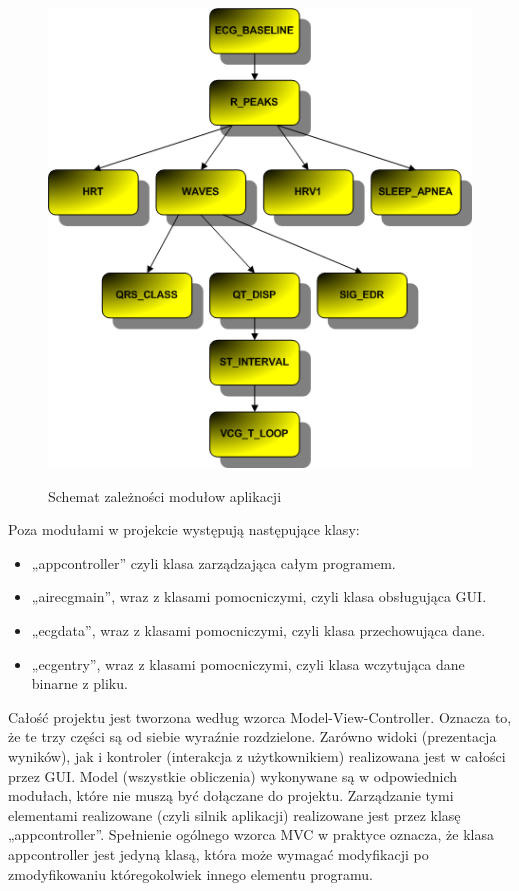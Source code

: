 \begin{figure}[H]
\centering
\includegraphics[scale=0.7]{MVC/img/EKG}
\label{fig:zaleznosci}
\caption{Schemat zależności modułow aplikacji}
\end{figure}

Poza modułami w projekcie występują następujące klasy:
\begin{itemize}
\item „appcontroller” czyli klasa zarządzająca całym programem.
\item „airecgmain”, wraz z klasami pomocniczymi, czyli klasa obsługująca GUI.
\item „ecgdata”, wraz z klasami pomocniczymi, czyli klasa przechowująca dane.
\item „ecgentry”, wraz z klasami pomocniczymi, czyli klasa wczytująca dane binarne z pliku.
\end{itemize}

Całość projektu jest tworzona według wzorca Model-View-Controller. Oznacza to, że te trzy części są od siebie wyraźnie rozdzielone. Zarówno widoki (prezentacja wyników), jak i kontroler (interakcja z użytkownikiem) realizowana jest w całości przez GUI. Model (wszystkie obliczenia) wykonywane są w odpowiednich modułach, które nie muszą być dołączane do projektu. Zarządzanie tymi elementami realizowane (czyli silnik aplikacji) realizowane jest przez klasę „appcontroller”. Spełnienie ogólnego wzorca MVC w praktyce oznacza, że klasa appcontroller jest jedyną klasą, która może wymagać modyfikacji po zmodyfikowaniu któregokolwiek innego elementu programu.

